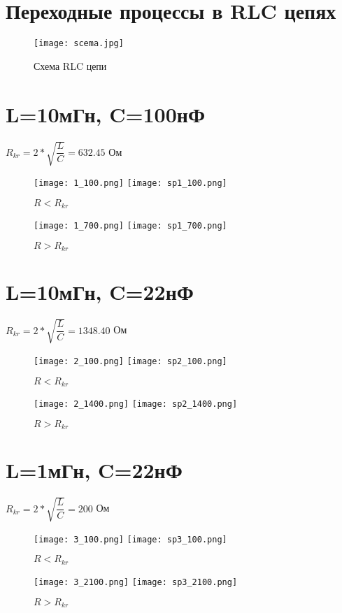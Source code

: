 \documentclass[a4paper,14pt]{article}
\begin{document}


\section{Переходные процессы в RLC цепях}

\begin{figure}[H]
	\centering
	\texttt{[image: scema.jpg]}
	\caption{Схема RLC цепи}	
\end{figure}

\pagebreak
\section{L=10мГн, C=100нФ}


$R_{kr} = 2 * \sqrt{\dfrac{L}{C}} = 632.45$ Ом

\begin{figure}[H]
	\centering
	\texttt{[image: 1\_100.png]}
	\texttt{[image: sp1\_100.png]}
	\caption{$R < R_{kr}$}	
\end{figure}

\begin{figure}[H]
	\centering
	\texttt{[image: 1\_700.png]}
	\texttt{[image: sp1\_700.png]}
	\caption{$R > R_{kr}$}	
\end{figure}

\pagebreak
\section{L=10мГн, C=22нФ}


$R_{kr} = 2 * \sqrt{\dfrac{L}{C}} = 1348.40$ Ом

\begin{figure}[H]
	\centering
	\texttt{[image: 2\_100.png]}
	\texttt{[image: sp2\_100.png]}
	\caption{$R < R_{kr}$}	
\end{figure}

\begin{figure}[H]
	\centering
	\texttt{[image: 2\_1400.png]}
	\texttt{[image: sp2\_1400.png]}
	\caption{$R > R_{kr}$}	
\end{figure}

\pagebreak
\section{L=1мГн, C=22нФ}


$R_{kr} = 2 * \sqrt{\dfrac{L}{C}} = 200$ Ом

\begin{figure}[H]
	\centering
	\texttt{[image: 3\_100.png]}
	\texttt{[image: sp3\_100.png]}
	\caption{$R < R_{kr}$}	
\end{figure}

\begin{figure}[H]
	\centering
	\texttt{[image: 3\_2100.png]}
	\texttt{[image: sp3\_2100.png]}
	\caption{$R > R_{kr}$}	
\end{figure}
\end{document}
